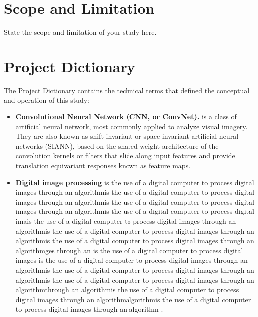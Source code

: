 \begin{refsection}
\section{Scope and Limitation}

State the scope and limitation of your study here.

\section{Project Dictionary}

The Project Dictionary contains the technical terms that defined the conceptual and operation of this study:

\begin{itemize}
    \item \textbf{Convolutional Neural Network (CNN, or ConvNet).} is a class of artificial neural network, most commonly applied to analyze visual imagery. They are also known as shift invariant or space invariant artificial neural networks (SIANN), based on the shared-weight architecture of the convolution kernels or filters that slide along input features and provide translation equivariant responses known as feature maps.
    \item \textbf{Digital image processing} is the use of a digital computer to process digital images through an algorithmis the use of a digital computer to process digital images through an algorithmis the use of a digital computer to process digital images through an algorithmis the use of a digital computer to process digital imais the use of a digital computer to process digital images through an algorithmis the use of a digital computer to process digital images through an algorithmis the use of a digital computer to process digital images through an algorithmges through an is the use of a digital computer to process digital images is the use of a digital computer to process digital images through an algorithmis the use of a digital computer to process digital images through an algorithmis the use of a digital computer to process digital images through an algorithmthrough an algorithmis the use of a digital computer to process digital images through an algorithmalgorithmis the use of a digital computer to process digital images through an algorithm \cite{scholes2011lessons}. 
\end{itemize}

	

\end{refsection}
